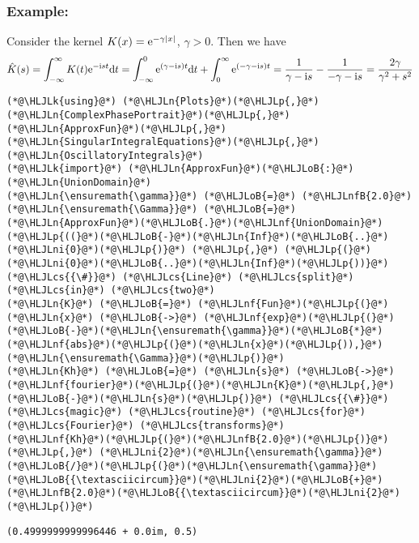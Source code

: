 \documentclass[12pt,landscape]{article}
\newcommand{\HLJLk}[1]{\textcolor[RGB]{148,91,176}{\textbf{#1}}}
\newcommand{\HLJLn}[1]{#1}
\newcommand{\HLJLnf}[1]{\textcolor[RGB]{66,102,213}{#1}}
\newcommand{\HLJLnfB}[1]{\textcolor[RGB]{59,151,46}{#1}}
\newcommand{\HLJLni}[1]{\textcolor[RGB]{59,151,46}{#1}}
\newcommand{\HLJLoB}[1]{\textcolor[RGB]{102,102,102}{\textbf{#1}}}
\newcommand{\HLJLp}[1]{#1}
\newcommand{\HLJLcs}[1]{\textcolor[RGB]{153,153,119}{\textit{#1}}}
\def\D{ {\rm d} }
\def\I{ {\rm i} }
\def\E{ {\rm e} }
\def\dt{\D t}
\begin{document}
{\subsubsection{Example:}
Consider the kernel $K(x) = \E^{-\gamma |x|}$, $\gamma > 0$. Then we have
\[
\hat K(s) = \int_{-\infty}^\infty K(t) \E^{-\I s t} \dt = \int_{-\infty}^0 \E^{( \gamma - \I s ) t} \dt  + \int_0^\infty \E^{(-\gamma - \I s ) t} = {1 \over  \gamma - \I s} - {1 \over -\gamma - \I s } 
= {2\gamma \over \gamma^2 + s^2}
\]

\begin{lstlisting}
(*@\HLJLk{using}@*) (*@\HLJLn{Plots}@*)(*@\HLJLp{,}@*) (*@\HLJLn{ComplexPhasePortrait}@*)(*@\HLJLp{,}@*) (*@\HLJLn{ApproxFun}@*)(*@\HLJLp{,}@*) (*@\HLJLn{SingularIntegralEquations}@*)(*@\HLJLp{,}@*) (*@\HLJLn{OscillatoryIntegrals}@*)
(*@\HLJLk{import}@*) (*@\HLJLn{ApproxFun}@*)(*@\HLJLoB{:}@*) (*@\HLJLn{UnionDomain}@*)
(*@\HLJLn{\ensuremath{\gamma}}@*) (*@\HLJLoB{=}@*) (*@\HLJLnfB{2.0}@*)
(*@\HLJLn{\ensuremath{\Gamma}}@*) (*@\HLJLoB{=}@*) (*@\HLJLn{ApproxFun}@*)(*@\HLJLoB{.}@*)(*@\HLJLnf{UnionDomain}@*)(*@\HLJLp{((}@*)(*@\HLJLoB{-}@*)(*@\HLJLn{Inf}@*)(*@\HLJLoB{..}@*)(*@\HLJLni{0}@*)(*@\HLJLp{)}@*) (*@\HLJLp{,}@*) (*@\HLJLp{(}@*)(*@\HLJLni{0}@*)(*@\HLJLoB{..}@*)(*@\HLJLn{Inf}@*)(*@\HLJLp{))}@*) (*@\HLJLcs{{\#}}@*) (*@\HLJLcs{Line}@*) (*@\HLJLcs{split}@*) (*@\HLJLcs{in}@*) (*@\HLJLcs{two}@*)
(*@\HLJLn{K}@*) (*@\HLJLoB{=}@*) (*@\HLJLnf{Fun}@*)(*@\HLJLp{(}@*)(*@\HLJLn{x}@*) (*@\HLJLoB{->}@*) (*@\HLJLnf{exp}@*)(*@\HLJLp{(}@*)(*@\HLJLoB{-}@*)(*@\HLJLn{\ensuremath{\gamma}}@*)(*@\HLJLoB{*}@*)(*@\HLJLnf{abs}@*)(*@\HLJLp{(}@*)(*@\HLJLn{x}@*)(*@\HLJLp{)),}@*) (*@\HLJLn{\ensuremath{\Gamma}}@*)(*@\HLJLp{)}@*)
(*@\HLJLn{Kh}@*) (*@\HLJLoB{=}@*) (*@\HLJLn{s}@*) (*@\HLJLoB{->}@*) (*@\HLJLnf{fourier}@*)(*@\HLJLp{(}@*)(*@\HLJLn{K}@*)(*@\HLJLp{,}@*) (*@\HLJLoB{-}@*)(*@\HLJLn{s}@*)(*@\HLJLp{)}@*) (*@\HLJLcs{{\#}}@*) (*@\HLJLcs{magic}@*) (*@\HLJLcs{routine}@*) (*@\HLJLcs{for}@*) (*@\HLJLcs{Fourier}@*) (*@\HLJLcs{transforms}@*)
(*@\HLJLnf{Kh}@*)(*@\HLJLp{(}@*)(*@\HLJLnfB{2.0}@*)(*@\HLJLp{)}@*) (*@\HLJLp{,}@*) (*@\HLJLni{2}@*)(*@\HLJLn{\ensuremath{\gamma}}@*)(*@\HLJLoB{/}@*)(*@\HLJLp{(}@*)(*@\HLJLn{\ensuremath{\gamma}}@*)(*@\HLJLoB{{\textasciicircum}}@*)(*@\HLJLni{2}@*)(*@\HLJLoB{+}@*)(*@\HLJLnfB{2.0}@*)(*@\HLJLoB{{\textasciicircum}}@*)(*@\HLJLni{2}@*)(*@\HLJLp{)}@*)
\end{lstlisting}

\begin{lstlisting}
(0.4999999999996446 + 0.0im, 0.5)
\end{lstlisting}


}
\end{document}

